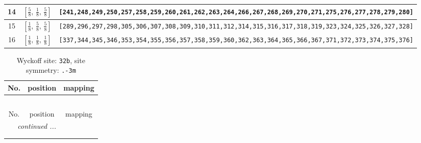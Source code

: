 \documentclass[fleqn,8pt]{jsarticle}
\begin{document}
\begin{longtable}{ccc}
14 & $\left[ \frac{5}{8},\, \frac{1}{8},\, \frac{5}{8} \right]$ & {\tt [241,248,249,250,257,258,259,260,261,262,263,264,266,267,268,269,270,271,275,276,277,278,279,280]} \\ \hline
15 & $\left[ \frac{1}{8},\, \frac{5}{8},\, \frac{5}{8} \right]$ & {\tt [289,296,297,298,305,306,307,308,309,310,311,312,314,315,316,317,318,319,323,324,325,326,327,328]} \\ \hline
16 & $\left[ \frac{1}{8},\, \frac{1}{8},\, \frac{1}{8} \right]$ & {\tt [337,344,345,346,353,354,355,356,357,358,359,360,362,363,364,365,366,367,371,372,373,374,375,376]} \\
\end{longtable}
\renewcommand{\arraystretch}{1.2}
\begin{longtable}{ccc}
\caption{Wyckoff site: {\tt 32b}, site symmetry: {\tt .-3m}}
 \\
 \hline \hline
No. & position & mapping \\ \hline \endfirsthead

\multicolumn{2}{l}{\tablename\ \thetable{}} \\
 \hline \hline
No. & position & mapping \\ \hline \endhead

 \hline \hline
\multicolumn{2}{r}{\footnotesize\it continued ...} \\ \endfoot

 \hline \hline
\multicolumn{2}{r}{} \\ \endlastfoot


\end{longtable}
\end{document}
